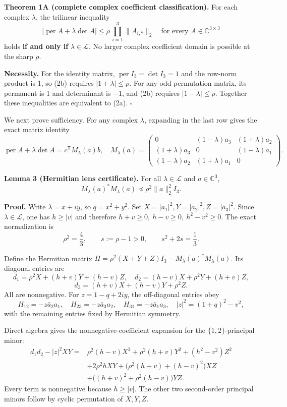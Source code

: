 \documentclass[
  11pt,
]{article}
\begin{document}
\textbf{Theorem 1A (complete complex coefficient classification).} For
each complex \(\lambda\), the trilinear inequality \[
\boxed{\quad
|\operatorname{per}A+\lambda\det A|
\le\rho\,\prod_{i=1}^3\|A_{i,*}\|_2
\quad\text{for every }A\in\mathbb C^{3\times3}
\quad}\tag{2b}
\] holds \textbf{if and only if} \(\lambda\in\mathcal L\). No larger
complex coefficient domain is possible at the sharp \(\rho\).

\textbf{Necessity.} For the identity matrix,
\(\operatorname{per}I_3=\det I_3=1\) and the row-norm product is 1, so
(2b) requires \(|1+\lambda|\le\rho\). For any odd permutation matrix,
its permanent is 1 and determinant is \(-1\), and (2b) requires
\(|1-\lambda|\le\rho\). Together these inequalities are equivalent to
(2a). \(\square\)

We next prove sufficiency. For any complex \(\lambda\), expanding in the
last row gives the exact matrix identity \[
\operatorname{per}A+\lambda\det A
=c^{\mathsf T}M_\lambda(a)b,
\quad
M_\lambda(a)=
\begin{pmatrix}
0&(1-\lambda)a_3&(1+\lambda)a_2\\
(1+\lambda)a_3&0&(1-\lambda)a_1\\
(1-\lambda)a_2&(1+\lambda)a_1&0
\end{pmatrix}.
\tag{2}
\]

\textbf{Lemma 3 (Hermitian lens certificate).} For all
\(\lambda\in\mathcal L\) and \(a\in\mathbb C^3\), \[
M_\lambda(a)^*M_\lambda(a)
\preceq\rho^2\|a\|_2^2I_3.
\tag{3}
\]

\textbf{Proof.} Write \(\lambda=x+iy\), so \(q=x^2+y^2\). Set
\(X=|a_1|^2,Y=|a_2|^2,Z=|a_3|^2\). Since \(\lambda\in\mathcal L\), one
has \(h\ge|v|\) and therefore \(h+v\ge0,\ h-v\ge0,\ h^2-v^2\ge0\). The
exact normalization is \[
\rho^2=\frac43,\qquad s:=\rho-1>0,\qquad
s^2+2s=\frac13.
\tag{4}
\]

Define the Hermitian matrix
\(H=\rho^2(X+Y+Z)I_3-M_\lambda(a)^*M_\lambda(a)\). Its diagonal entries
are \[
d_1=\rho^2X+(h+v)Y+(h-v)Z,\quad
d_2=(h-v)X+\rho^2Y+(h+v)Z,
\] \[
d_3=(h+v)X+(h-v)Y+\rho^2Z.
\tag{5}
\] All are nonnegative. For \(z=1-q+2iy\), the off-diagonal entries obey
\[
H_{12}=-z\bar a_2a_1,\quad
H_{23}=-z\bar a_3a_2,\quad
H_{31}=-z\bar a_1a_3,
\quad
|z|^2=(1+q)^2-v^2,
\tag{6}
\] with the remaining entries fixed by Hermitian symmetry.

Direct algebra gives the nonnegative-coefficient expansion for the
\(\{1,2\}\)-principal minor: \[
\boxed{
\begin{aligned}
d_1d_2-|z|^2XY={}&
\rho^2(h-v)X^2+\rho^2(h+v)Y^2+(h^2-v^2)Z^2\\
&+2\rho^2hXY
+\bigl(\rho^2(h+v)+(h-v)^2\bigr)XZ\\
&+\bigl((h+v)^2+\rho^2(h-v)\bigr)YZ .
\end{aligned}}
\tag{7}
\] Every term is nonnegative because \(h\ge|v|\). The other two
second-order principal minors follow by cyclic permutation of \(X,Y,Z\).
\end{document}
